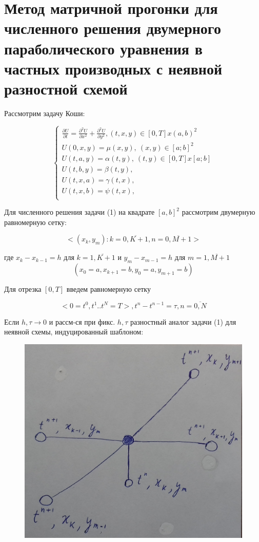 \documentclass[__main__.tex]{subfiles}
\begin{document}
\section{Метод матричной прогонки для численного решения двумерного параболического уравнения в частных производных с неявной разностной схемой}

Рассмотрим задачу Коши:

\begin{equation} \label{50.1}
\begin{cases}
\frac{\partial U}{\partial t} = \frac{\partial^2 U}{\partial x^2} + \frac{\partial^2 U}{\partial y^2}, (t, x, y) \in [0, T] x (a, b)^2 \\
U(0,x,y) = \mu(x,y), \ (x,y)\in [a;b]^2 \\
U(t,a,y) = \alpha(t,y), \ (t,y)\in [0, T] x [a;b] \\
U(t,b,y) = \beta(t,y), \\
U(t,x,a) = \gamma(t,x), \\
U(t,x,b) = \psi(t,x), \\
\end{cases}
\end{equation}

Для численного решения задачи (1) на квадрате $[a,b]^2$ рассмотрим двумерную равномерную сетку:

\begin{equation}\label{50.2}
<(x_k, y_m): k = \overline{0,K+1}, n = \overline{0,M+1}>
\end{equation}

где $x_k-x_{k-1} = h$ для $k = \overline{1,K+1}$ и $y_m-x_{m-1} = h$ для $m = \overline{1,M+1}$
$$
(x_0 = a, x_{k+1} = b, y_0 = a, y_{m+1} = b)
$$

Для отрезка $[0, T]$ введем равномерную сетку 

\begin{equation}\label{50.3}
<0=t^0, t^1 .. t^N = T>, t^n - t^{n-1} = \tau, n = \overline{0,N}
\end{equation}

Если $h, \tau \rightarrow 0$ и рассм-ся при фикс. $h, \tau$ разностный аналог задачи (1) для неявной схемы, индуцированный шаблоном:

\begin{figure}[ht]
	\centering
	\includegraphics[width=0.4\linewidth]{img/img_50_1}
	\caption{}
	\label{img_42.1}
\end{figure}
\end{document}
